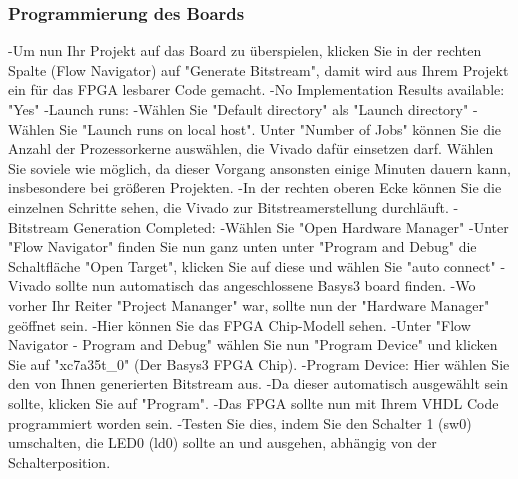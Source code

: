 \documentclass{article}
\begin{document}
\subsubsection{Programmierung des Boards}
-Um nun Ihr Projekt auf das Board zu \"uberspielen, klicken Sie in der rechten Spalte (Flow Navigator) auf "Generate Bitstream", damit wird aus Ihrem Projekt ein für das FPGA lesbarer Code gemacht.\newline
-No Implementation Results available: "Yes"\newline
-Launch runs:\newline
-W\"ahlen Sie "Default directory" als "Launch directory" \newline
-W\"ahlen Sie "Launch runs on local host". Unter "Number of Jobs" k\"onnen Sie die Anzahl der Prozessorkerne ausw\"ahlen, die Vivado dafür einsetzen darf. W\"ahlen Sie soviele wie m\"oglich, da dieser Vorgang ansonsten einige Minuten dauern kann, insbesondere bei gr\"o{\ss}eren Projekten.\newline
-In der rechten oberen Ecke k\"onnen Sie die einzelnen Schritte sehen, die Vivado zur Bitstreamerstellung durchl\"auft.\newline
-Bitstream Generation Completed:\newline
-W\"ahlen Sie "Open Hardware Manager"\newline
-Unter "Flow Navigator" finden Sie nun ganz unten unter "Program and Debug" die Schaltfl\"ache "Open Target", klicken Sie auf diese und w\"ahlen Sie "auto connect"\newline
-Vivado sollte nun automatisch das angeschlossene Basys3 board finden.\newline
-Wo vorher Ihr Reiter "Project Mananger" war, sollte nun der "Hardware Manager" ge\"offnet sein.\newline
-Hier können Sie das FPGA Chip-Modell sehen.\newline
-Unter "Flow Navigator - Program and Debug" w\"ahlen Sie nun "Program Device" und klicken Sie auf "xc7a35t\_0" (Der Basys3 FPGA Chip).\newline
-Program Device: Hier w\"ahlen Sie den von Ihnen generierten Bitstream aus.\newline
-Da dieser automatisch ausgewählt sein sollte, klicken Sie auf "Program".\newline
-Das FPGA sollte nun mit Ihrem VHDL Code programmiert worden sein.\newline
-Testen Sie dies, indem Sie den Schalter 1 (sw0) umschalten, die LED0 (ld0) sollte an und ausgehen, abh\"angig von der Schalterposition.\newline
\end{document}

